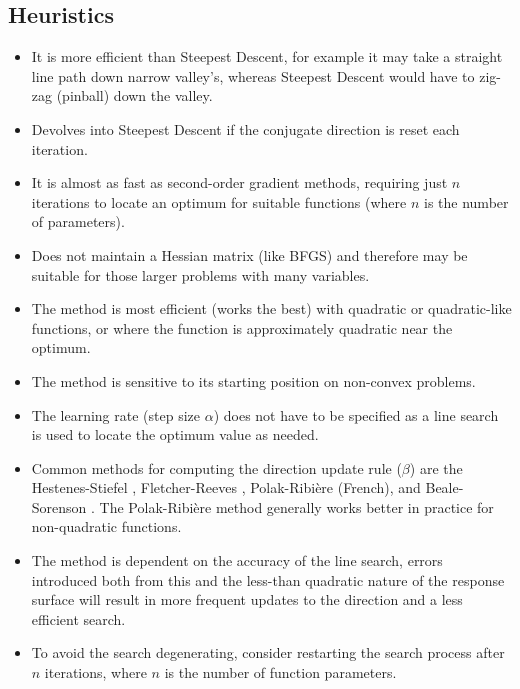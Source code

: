\subsection{Heuristics}

\begin{itemize}
	\item It is more efficient than Steepest Descent, for example it may take a straight line path down narrow valley's, whereas Steepest Descent would have to zig-zag (pinball) down the valley.
	\item Devolves into Steepest Descent if the conjugate direction is reset each iteration.
	\item It is almost as fast as second-order gradient methods, requiring just $n$ iterations to locate an optimum for suitable functions (where $n$ is the number of parameters).
	\item Does not maintain a Hessian matrix (like BFGS) and therefore may be suitable for those larger problems with many variables.
	\item The method is most efficient (works the best) with quadratic or quadratic-like functions, or where the function is approximately quadratic near the optimum.
	\item The method is sensitive to its starting position on non-convex problems.
	\item The learning rate (step size $\alpha$) does not have to be specified as a line search is used to locate the optimum value as needed.
	\item Common methods for computing the direction update rule ($\beta$) are the Hestenes-Stiefel \cite{Hestenes1952}, Fletcher-Reeves \cite{Fletcher1964}, Polak-Ribi\`ere \cite{Polak1969} (French), and Beale-Sorenson \cite{Beale1972, Sorenson1969}. The Polak-Ribi\`ere method generally works better in practice for non-quadratic functions.
	\item The method is dependent on the accuracy of the line search, errors introduced both from this and the less-than quadratic nature of the response surface will result in more frequent updates to the direction and a less efficient search.
	\item To avoid the search degenerating, consider restarting the search process after $n$ iterations, where $n$ is the number of function parameters.
\end{itemize}


